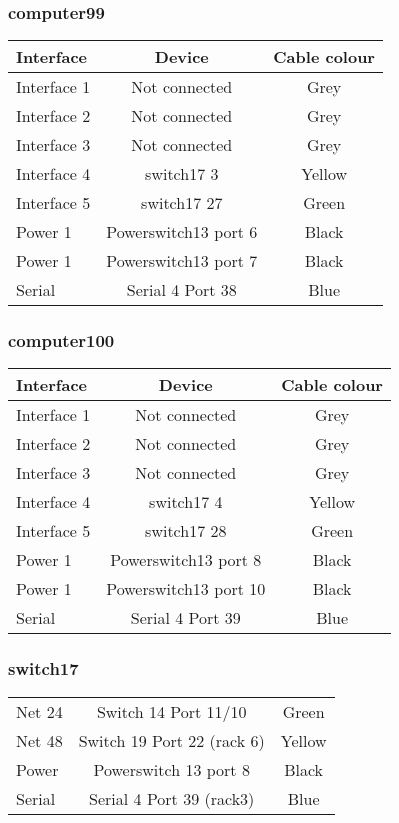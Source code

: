 \subsubsection{computer99}

\begin{table}[H]
\begin{tabular}{|l|c|c|}\hline
Interface & Device & Cable colour \\ \hline
Interface 1 & Not connected & Grey \\
Interface 2 & Not connected & Grey \\
Interface 3 & Not connected & Grey \\
Interface 4 & switch17 3 & Yellow \\
Interface 5 & switch17 27 & Green \\
Power 1 & Powerswitch13 port 6 & Black \\
Power 1 & Powerswitch13 port 7 & Black \\
Serial & Serial 4 Port 38 & Blue \\ \hline
\end{tabular}
\end{table}

\subsubsection{computer100}

\begin{table}[H]
\begin{tabular}{|l|c|c|}\hline
Interface & Device & Cable colour \\ \hline
Interface 1 & Not connected & Grey \\
Interface 2 & Not connected & Grey \\
Interface 3 & Not connected & Grey \\
Interface 4 & switch17 4 & Yellow \\
Interface 5 & switch17 28 & Green \\
Power 1 & Powerswitch13 port 8 & Black \\
Power 1 & Powerswitch13 port 10 & Black \\
Serial & Serial 4 Port 39 & Blue \\ \hline
\end{tabular}
\end{table}


\subsubsection{switch17}
\begin{table}[H]
\begin{tabular}{|l|c|c|}\hline
Net 24 & Switch 14 Port 11/10 & Green \\
Net 48 & Switch 19 Port 22 (rack 6) & Yellow \\
Power & Powerswitch 13 port 8 & Black \\
Serial & Serial 4 Port 39 (rack3) & Blue \\ \hline
\end{tabular}
\end{table}

